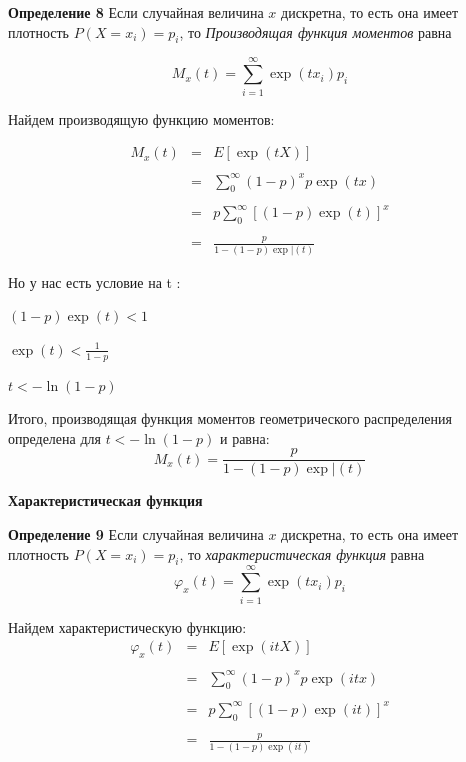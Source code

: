 \documentclass[a4paper,12pt, oneside]{book}
\begin{document}
{\normalsize{\textbf{Определение 8}} Если случайная величина $x$ дискретна, то есть она имеет плотность $P(X = x_i) = p_i$, то \textit{ Производящая функция моментов } равна

$$
M_x(t) =  \sum\limits_{i=1}^{\infty} \exp(tx_i) p_i
$$


Найдем производящую функцию моментов:

$$
\begin{array}{rcl}
M_x(t) &=& E[\exp(tX)] \\
\\
&=&\sum\limits_{0}^{\infty} (1 - p)^x p \exp(tx)\\
\\
&=& p \sum\limits_{0}^{\infty} [(1 - p)  \exp(t)]^x\\
\\
&=& \frac{p}{1-(1-p)\exp|(t)}
\end{array}
$$

\vspace{5mm}
Но у нас есть условие на t :
\vspace{3mm}

$(1 - p)  \exp(t) < 1 $
\vspace{3mm}

$\exp(t) < \frac{1}{1-p}$
\vspace{3mm}

$t < -\ln(1-p)$

\vspace{5mm}
Итого, производящая функция моментов геометрического распределения определена для $t < -\ln(1-p)$ и равна:
$$
M_x(t) = \frac{p}{1-(1-p)\exp|(t)}
$$


\vspace{5mm}
\large{\textbf{{Характеристическая функция}}}
\vspace{5mm}

\normalsize{\textbf{Определение 9  }}Если случайная величина $x$ дискретна, то есть она имеет плотность $P(X = x_i) = p_i$, то \textit{ характеристическая функция } равна
$$
\varphi_x(t) =  \sum\limits_{i=1}^{\infty} \exp(tx_i) p_i
$$

Найдем характеристическую функцию:
$$
\begin{array}{rcl}
\varphi_x(t) &=& E[\exp(itX)]\\
\\
&=&\sum\limits_{0}^{\infty} (1-p)^x p \exp(itx)\\
\\
&=&p \sum\limits_{0}^{\infty} [(1-p)\exp(it)]^x\\
\\
&=&\frac{p}{1-(1-p)\exp(it)}
\end{array}
$$

}
\end{document}

